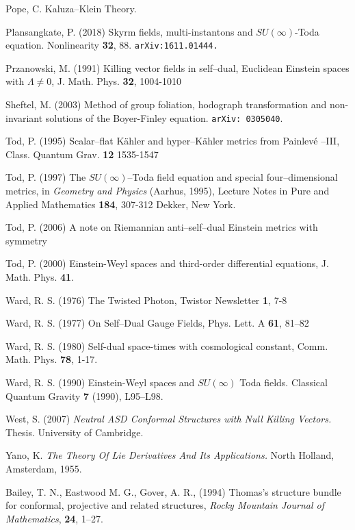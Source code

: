 \begin{thebibliography}{}
 Pope, C. Kaluza--Klein Theory.

 Plansangkate, P. (2018)
Skyrm fields, multi-instantons and $SU(\infty)$-Toda equation.
Nonlinearity {\bf 32}, 88.
{\tt arXiv:1611.01444.}

 Przanowski, M. (1991)
Killing vector fields in self--dual, Euclidean Einstein spaces with $\Lambda\neq 0$,
J. Math. Phys. {\bf 32}, 1004-1010

 Sheftel, M. (2003)
Method of group foliation, hodograph transformation and non-invariant solutions of the Boyer-Finley equation.
{\tt arXiv: 0305040}.

 Tod, P. (1995)
Scalar--flat K\"ahler and hyper--K\"ahler metrics from Painlev\'e --III,
Class. Quantum Grav. {\bf 12} 1535-1547

 Tod, P. (1997)
The $SU(\infty)$--Toda field equation and special four--dimensional metrics,
in {\em Geometry and Physics} (Aarhus, 1995), Lecture Notes in Pure and Applied Mathematics {\bf 184}, 307-312 Dekker, New York.

 Tod, P. (2006) {A note on Riemannian anti--self--dual Einstein metrics with symmetry}

 Tod, P. (2000) {Einstein-Weyl spaces and third-order differential equations}, J. Math. Phys. {\bf 41}.



 Ward, R. S. (1976)
The Twisted Photon,
Twistor Newsletter {\bf 1}, 7-8

 Ward, R. S. (1977)
On Self--Dual Gauge Fields,
Phys. Lett. A {\bf 61}, 81--82

   Ward, R. S. (1980)
Self-dual space-times with cosmological constant,
Comm. Math. Phys. {\bf 78},  1-17.

 Ward, R. S. (1990) Einstein-Weyl spaces and 
$SU(\infty)$ Toda fields. Classical Quantum Gravity {\bf 7} (1990), L95–L98.


 West, S. (2007) {\em Neutral ASD Conformal Structures with Null Killing Vectors.} Thesis. University of Cambridge.

 Yano, K. {\em The Theory Of Lie Derivatives And Its Applications.} North Holland, Amsterdam, 1955.




 Bailey, T. N., Eastwood M. G., Gover, A. R., (1994)
Thomas's structure bundle for conformal, projective
  and related structures, {\em Rocky Mountain Journal of
    Mathematics}, {\bf 24}, 1--27.
  

\end{thebibliography}
